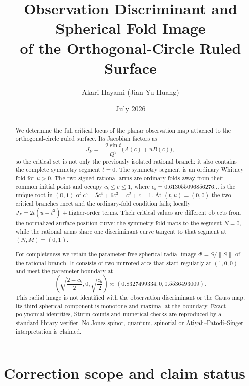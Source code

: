 \documentclass[11pt]{article}
\title{\textbf{Observation Discriminant and Spherical Fold Image}\\
\large of the Orthogonal-Circle Ruled Surface}
\author{Akari Hayami (Jian-Yu Huang)}
\date{July 2026}
\theoremstyle{definition}
\begin{document}
\maketitle

\begin{abstract}
We determine the full critical locus of the planar observation map attached
to the orthogonal-circle ruled surface.  Its Jacobian factors as
\[
J_F=-\frac{2\sin t}{Q^3}\bigl(A(c)+uB(c)\bigr),
\]
so the critical set is not only the previously isolated rational branch: it
also contains the complete symmetry segment $t=0$.  The symmetry segment is
an ordinary Whitney fold for $u>0$.  The two signed rational arms are ordinary
folds away from their common initial point and occupy
$c_b\leq c\leq1$, where
$c_b=0.613055096856276\ldots$ is the unique root in $(0,1)$ of
$c^5-5c^4+6c^3-c^2+c-1$.  At $(t,u)=(0,0)$ the two critical branches meet and
the ordinary-fold condition fails; locally
$J_F=2t(u-t^2)+\text{higher-order terms}$.  Their critical values are
different objects from the normalized surface-position curve: the symmetry
fold maps to the segment $N=0$, while the rational arms share one
discriminant curve tangent to that segment at $(N,M)=(0,1)$.

For completeness we retain the parameter-free spherical radial image
$\Phi=S/\lVert S\rVert$ of the rational branch.  It consists of two mirrored
arcs that start regularly at $(1,0,0)$ and meet the parameter boundary at
\[
\left(\sqrt{\frac{2-c_b}{2}},0,\sqrt{\frac{c_b}{2}}\right)
\approx(0.8327499334,0,0.5536493009).
\]
This radial image is not identified with the observation discriminant or the
Gauss map.  Its third spherical component is monotone and maximal at the
boundary.  Exact polynomial identities, Sturm counts and numerical checks are
reproduced by a standard-library verifier.  No Jones-spinor, quantum,
spinorial or Atiyah--Patodi--Singer interpretation is claimed.
\end{abstract}

\section{Correction scope and claim status}
\end{document}
